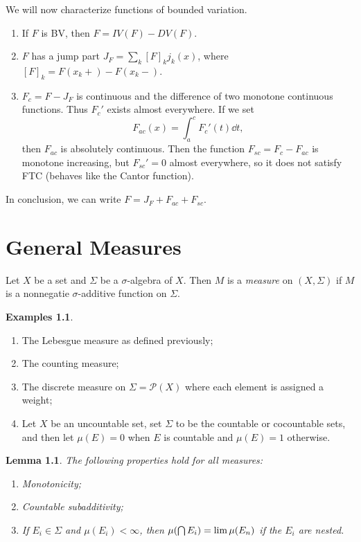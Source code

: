 \documentclass[leqno, openany]{memoir}
\newtheorem{lem}[thm]{Lemma}
\theoremstyle{definition}
\newtheorem{exms}[thm]{Examples}
\theoremstyle{remark}
\theoremstyle{plain}
\theoremstyle{definition}
\theoremstyle{remark}
\newcommand{\mc}[1]{\mathcal{#1}}
\begin{document}
We will now characterize functions of bounded variation.  \begin{enumerate}
    \item If $F$ is BV, then $F = IV(F) - DV(F)$.  \item $F$ has a jump part
        $J_F = \sum_k [F]_k j_k(x)$, where $[F]_k = F(x_k+) - F(x_k-)$.  \item
        $F_c = F - J_F$ is continuous and the difference of two monotone
        continuous functions. Thus $F_c'$ exists almost everywhere. If we set
        \[ F_{ac}(x) = \int_a^c F_c'(t) \dd{t}, \] then $F_{ac}$ is absolutely
        continuous. Then the function $F_{sc} = F_c - F_{ac}$ is monotone
        increasing, but $F_{sc}' = 0$ almost everywhere, so it does not satisfy
        FTC (behaves like the Cantor function).  \end{enumerate} In conclusion,
        we can write $F = J_F + F_{ac} + F_{sc}$.

\chapter{General Measures}%

Let $X$ be a set and $\Sigma$ be a $\sigma$-algebra of $X$. Then $M$ is a
\textit{measure} on $(X, \Sigma)$ if $M$ is a nonnegatie $\sigma$-additive
function on $\Sigma$.

\begin{exms} \begin{enumerate} \item The Lebesgue measure as defined
    previously; \item The counting measure; \item The discrete measure on
    $\Sigma = \mc{P}(X)$ where each element is assigned a weight; \item Let $X$
    be an uncountable set, set $\Sigma$ to be the countable or cocountable
    sets, and then let $\mu(E) = 0$ when $E$ is countable and $\mu(E) = 1$
    otherwise.  \end{enumerate} \end{exms}

\begin{lem} The following properties hold for all measures: \begin{enumerate}
    \item Monotonicity; \item Countable subadditivity; \item If $E_i \in
        \Sigma$ and $\mu(E_i) < \infty$, then $\mu \qty(\bigcap E_i) = \lim
        \mu(E_n)$ if the $E_i$ are nested.  \end{enumerate} \end{lem}
\end{document}
